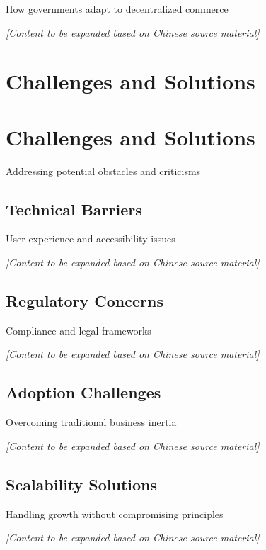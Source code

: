 \documentclass[
  Letterpaper,
]{scrbook}
\begin{document}
How governments adapt to decentralized commerce

\emph{{[}Content to be expanded based on Chinese source material{]}}

\chapter{Challenges and Solutions}\label{challenges-and-solutions}

\chapter{Challenges and Solutions}\label{sec-challenges-solutions}

Addressing potential obstacles and criticisms

\section{Technical Barriers}\label{technical-barriers}

User experience and accessibility issues

\emph{{[}Content to be expanded based on Chinese source material{]}}

\section{Regulatory Concerns}\label{regulatory-concerns}

Compliance and legal frameworks

\emph{{[}Content to be expanded based on Chinese source material{]}}

\section{Adoption Challenges}\label{adoption-challenges}

Overcoming traditional business inertia

\emph{{[}Content to be expanded based on Chinese source material{]}}

\section{Scalability Solutions}\label{scalability-solutions}

Handling growth without compromising principles

\emph{{[}Content to be expanded based on Chinese source material{]}}
\end{document}
